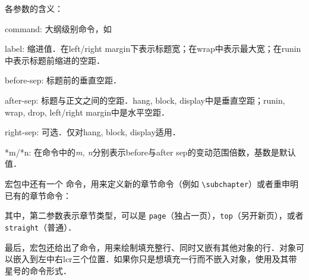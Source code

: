 各参数的含义：
\begin{para}
\item[command:] 大纲级别命令，如
\item[label:] 缩进值．在left/right margin下表示标题宽；在wrap中表示最大宽；在runin中表示标题前缩进的空距．
\item[before-sep:] 标题前的垂直空距．
\item[after-sep:] 标题与正文之间的空距．hang, block, display中是垂直空距；runin, wrap, drop, left/right margin中是水平空距．
\item[right-sep:] 可选．仅对hang, block, display适用．
\item[*m/*n:] 在命令中的\textit{m, n}分别表示before与after sep的变动范围倍数，基数是默认值．
\end{para}

宏包中还有一个  命令，用来定义新的章节命令（例如 \verb|\subchapter|）或者重申明已有的章节命令：
其中，第二参数表示章节类型，可以是 \texttt{page}（独占一页），\texttt{top}（另开新页），或者 \texttt{straight}（普通）．

最后，宏包还给出了命令，用来绘制填充整行、同时又嵌有其他对象的行．对象可以嵌入到左中右lcr三个位置．如果你只是想填充一行而不嵌入对象，使用及其带星号的命令形式．
\begin{latex}
\end{latex}

